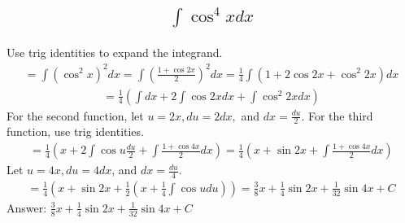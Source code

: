 \documentclass{article}
\begin{document}
\subsection{
	\begin{align*}
		\int{\cos^4{x} dx}
	\end{align*}
}
Use trig identities to expand the integrand.
\begin{align*}
	= \int{\left( \cos^2{x} \right)^2 dx} = \int{\left( \frac{1 + \cos{2x}}{2} \right)^2 dx} = \frac{1}{4}\int{\left( 1 + 2\cos{2x} + \cos^2{2x} \right) dx} 
\end{align*}
\begin{align*}
	= \frac{1}{4} \left( \int{dx} + 2\int{\cos{2x}dx} + \int{\cos^2{2x}dx} \right)
\end{align*}
For the second function, let $u = 2x, du = 2dx,$ and $dx = \frac{du}{2}$. For the third function, use trig identities. 
\begin{align*}
	= \frac{1}{4} \left( x + 2 \int{\cos{u} \frac{du}{2}} + \int{\frac{1 + \cos{4x}}{2}dx} \right) = \frac{1}{4} \left( x + \sin{2x} + \int{\frac{1 + \cos{4x}}{2}dx} \right)
\end{align*}
Let $u = 4x, du = 4dx$, and $dx = \frac{du}{4}$.
\begin{align*}
	= \frac{1}{4} \left( x + \sin{2x} + \frac{1}{2} \left( x + \frac{1}{4}\int{\cos{u}du} \right) \right) = \frac{3}{8}x + \frac{1}{4}\sin{2x} + \frac{1}{32}\sin{4x} + C
\end{align*}
Answer: $\frac{3}{8}x + \frac{1}{4}\sin{2x} + \frac{1}{32}\sin{4x} + C$

\end{document}
